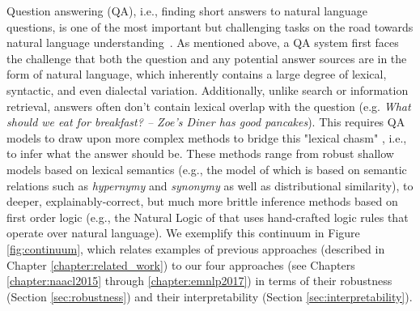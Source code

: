 Question answering (QA), i.e., finding short answers to natural language questions, is one of the most important but challenging 
tasks on the road towards natural language understanding~\citep{Etzioni:11}. 
As mentioned above, a QA system first faces the challenge that both the question and any potential answer sources are in the form of natural language, which inherently contains a large degree of lexical, syntactic, and even dialectal variation.
Additionally, unlike search or information retrieval, answers often don't contain lexical overlap with the question (e.g. {\em What should we eat for breakfast? -- Zoe's Diner has good pancakes}).  This requires QA models to draw upon more complex methods to bridge this "lexical chasm" \citep{Berger:00}, i.e., to infer what the answer should be.  These methods range from robust shallow models based on lexical semantics (e.g., the model of \citet{yih13} which is based on semantic relations such as \textit{hypernymy} and \textit{synonymy} as well as distributional similarity), to deeper, explainably-correct, but much more brittle inference methods based on first order logic (e.g., the Natural Logic of \citet{maccartney2009natural} that uses hand-crafted logic rules that operate over natural language).  We exemplify this continuum in Figure \ref{fig:continuum}, which relates examples of previous approaches (described in Chapter \ref{chapter:related_work}) to our four approaches (see Chapters \ref{chapter:naacl2015} through \ref{chapter:emnlp2017}) in terms of their robustness (Section \ref{sec:robustness}) and their interpretability (Section \ref{sec:interpretability}).  


